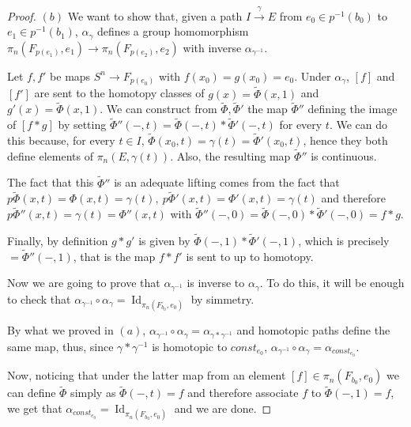 \documentclass{article}
\DeclareMathOperator{\Id}{Id}
\begin{document}
\begin{proof}
    $(b)$ We want to show that, given a path $I\xrightarrow{\gamma}E$ from $e_0\in
    p^{-1}(b_0)$ to $e_1\in p^{-1}(b_1)$, $\alpha_{\gamma}$ defines a group
    homomorphism $\pi_n(F_{p(e_1)},e_1)\rightarrow\pi_n(F_{p(e_2)},e_2)$ with
    inverse $\alpha_{\gamma^{-1}}$.

    Let $f,f'$ be maps $S^n\rightarrow F_{p(e_0)}$ with $f(x_0)=g(x_0)=e_0$.
    Under $\alpha_{\gamma}$, $[f]$ and $[f']$ are sent to the homotopy classes
    of $g(x)=\tilde{\Phi}(x,1)$ and $g'(x)=\tilde{\Phi}(x,1)$. We can construct
    from $\tilde{\Phi},\tilde{\Phi}'$ the map $\tilde{\Phi}''$ defining the
    image of $[f*g]$ by setting
    $\tilde{\Phi}''(-,t)=\tilde{\Phi}(-,t)*\tilde{\Phi}'(-,t)$ for every $t$.
    We can do this because, for every $t\in I$,
    $\tilde{\Phi}(x_0,t)=\gamma(t)=\tilde{\Phi}'(x_0,t)$, hence they both define
    elements of $\pi_n(E,\gamma(t))$. Also, the resulting map $\tilde{\Phi}''$
    is continuous.

    The fact that this $\tilde{\Phi}''$ is an adequate lifting comes from the
    fact that
    $p\tilde{\Phi}(x,t)=\Phi(x,t)=\gamma(t),\ p\tilde{\Phi}'(x,t)=\Phi'(x,t)=
    \gamma(t)$ and therefore $p\tilde{\Phi}''(x,t)=\gamma(t)=\Phi''(x,t)$ with
    $\tilde{\Phi}''(-,0)=\tilde{\Phi}(-,0)*\tilde{\Phi}'(-,0)=f*g$.

    Finally, by definition $g*g'$ is given by $\tilde{\Phi}(-,1)*\tilde{\Phi}'
    (-,1)$, which is precisely $=\tilde{\Phi}''(-,1)$, that is the map $f*f'$
    is sent to up to homotopy.

    Now we are going to prove that $\alpha_{\gamma^{-1}}$ is inverse to
    $\alpha_{\gamma}$. To do this, it will be enough to check that
    $\alpha_{\gamma^{-1}}\circ\alpha_{\gamma}=\Id_{\pi_n(F_{b_0},e_0)}$ by
    simmetry.

    By what we proved in $(a)$,
    $\alpha_{\gamma^{-1}}\circ\alpha_{\gamma}=\alpha_{\gamma*\gamma^{-1}}$ and
    homotopic paths define the same map, thus, since
    $\gamma*\gamma^{-1}$ is homotopic to $const_{e_0}$,
    $\alpha_{\gamma^{-1}}\circ\alpha_{\gamma}=\alpha_{const_{e_0}}$.

    Now, noticing that under the latter map from an element
    $[f]\in\pi_n(F_{b_0},e_0)$ we can define $\tilde{\Phi}$ simply as
    $\tilde{\Phi}(-,t)=f$ and therefore associate $f$ to
    $\tilde{\Phi}(-,1)=f$, we get that
    $\alpha_{const_{e_0}}=\Id_{\pi_n(F_{b_0},e_0)}$ and we are done.
\end{proof}
\end{document}
